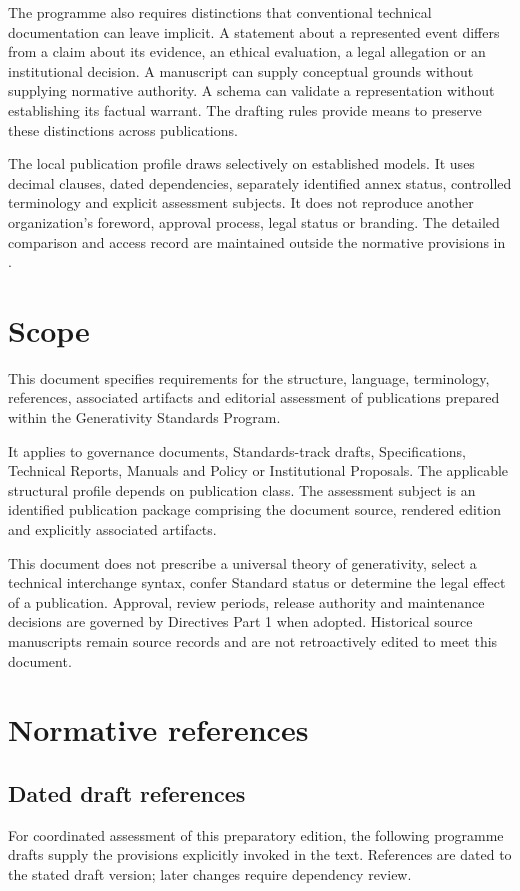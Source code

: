 \documentclass[11pt,a4paper]{article}
\begin{document}
The programme also requires distinctions that conventional technical documentation can leave implicit. A statement about a represented event differs from a claim about its evidence, an ethical evaluation, a legal allegation or an institutional decision. A manuscript can supply conceptual grounds without supplying normative authority. A schema can validate a representation without establishing its factual warrant. The drafting rules provide means to preserve these distinctions across publications.

The local publication profile draws selectively on established models. It uses decimal clauses, dated dependencies, separately identified annex status, controlled terminology and explicit assessment subjects. It does not reproduce another organization's foreword, approval process, legal status or branding. The detailed comparison and access record are maintained outside the normative provisions in .

\GSPmainmatter
\section{Scope}
This document specifies requirements for the structure, language, terminology, references, associated artifacts and editorial assessment of publications prepared within the Generativity Standards Program.

It applies to governance documents, Standards-track drafts, Specifications, Technical Reports, Manuals and Policy or Institutional Proposals. The applicable structural profile depends on publication class. The assessment subject is an identified publication package comprising the document source, rendered edition and explicitly associated artifacts.

This document does not prescribe a universal theory of generativity, select a technical interchange syntax, confer Standard status or determine the legal effect of a publication. Approval, review periods, release authority and maintenance decisions are governed by Directives Part 1 when adopted. Historical source manuscripts remain source records and are not retroactively edited to meet this document.

\section{Normative references}
\subsection{Dated draft references}
For coordinated assessment of this preparatory edition, the following programme drafts supply the provisions explicitly invoked in the text. References are dated to the stated draft version; later changes require dependency review.
\end{document}
